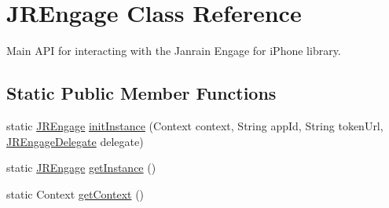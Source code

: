 \hypertarget{classcom_1_1janrain_1_1android_1_1engage_1_1_j_r_engage}{
\section{JREngage Class Reference}
\label{classcom_1_1janrain_1_1android_1_1engage_1_1_j_r_engage}
}


Main API for interacting with the Janrain Engage for iPhone library.  


\subsection*{Static Public Member Functions}
\begin{DoxyCompactItemize}
\item 
static \hyperlink{classcom_1_1janrain_1_1android_1_1engage_1_1_j_r_engage}{JREngage} \hyperlink{classcom_1_1janrain_1_1android_1_1engage_1_1_j_r_engage_a7c79a12fbe98d3dc3567f481b164e4f4}{initInstance} (Context context, String appId, String tokenUrl, \hyperlink{interfacecom_1_1janrain_1_1android_1_1engage_1_1_j_r_engage_delegate}{JREngageDelegate} delegate)
\item 
static \hyperlink{classcom_1_1janrain_1_1android_1_1engage_1_1_j_r_engage}{JREngage} \hyperlink{classcom_1_1janrain_1_1android_1_1engage_1_1_j_r_engage_a9ce0c212c5efaf0f55bc44a36a1ac688}{getInstance} ()
\item 
static Context \hyperlink{classcom_1_1janrain_1_1android_1_1engage_1_1_j_r_engage_ad04a8cdf9f047d3578cf40af5a4b927d}{getContext} ()
\end{DoxyCompactItemize}
